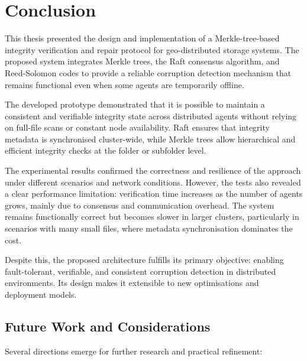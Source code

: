 \chapter{Conclusion}

This thesis presented the design and implementation of a Merkle-tree-based integrity verification and repair protocol for geo-distributed storage systems.
The proposed system integrates Merkle trees, the Raft consensus algorithm, and Reed-Solomon codes to provide a reliable corruption detection mechanism that remains functional even when some agents are temporarily offline.

The developed prototype demonstrated that it is possible to maintain a consistent and verifiable integrity state across distributed agents without relying on full-file scans or constant node availability.
Raft ensures that integrity metadata is synchronised cluster-wide, while Merkle trees allow hierarchical and efficient integrity checks at the folder or subfolder level.

The experimental results confirmed the correctness and resilience of the
approach under different scenarios and network conditions.
However, the tests also revealed a clear performance limitation: verification time increases as the number of agents grows, mainly due to consensus and communication overhead.
The system remains functionally correct but becomes slower in larger clusters, particularly in scenarios with many small files, where metadata synchronisation dominates the cost.

Despite this, the proposed architecture fulfills its primary objective: enabling fault-tolerant, verifiable, and consistent corruption detection in distributed environments.
Its design makes it extensible to new optimisations and deployment models.

\section*{Future Work and Considerations}

Several directions emerge for further research and practical refinement:

